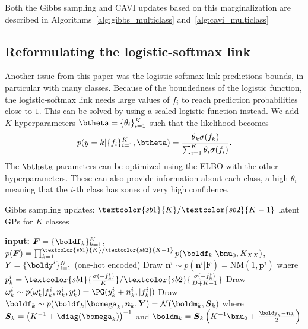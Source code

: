Both the Gibbs sampling and \ac{CAVI} updates based on this marginalization are described in Algorithms~\ref{alg:gibbs_multiclass} and~\ref{alg:cavi_multiclass}

\subsection{Reformulating the logistic-softmax link}
\label{sec:scale_multiclass}
Another issue from this paper was the logistic-softmax link predictions bounds, in particular with many classes.
Because of the boundedness of the logistic function, the logistic-softmax link needs large values of $f_i$ to reach prediction probabilities close to $1$.
This can be solved by using a scaled logistic function instead.
We add $K$ hyperparameters $\btheta=\{\theta_{i}\}_{i=1}^K$ such that the likelihood becomes
\begin{align*}
    p(y=k|\{f_i\}_{i=1}^K,\btheta) = \frac{\theta_k \sigma(f_k)}{\sum_{i=1}^K \theta_i \sigma(f_i)}.
\end{align*}
The $\btheta$ parameters can be optimized using the \ac{ELBO} with the other hyperparameters.
These can also provide information about each class, a high $\theta_i$ meaning that the $i$-th class has zones of very high confidence.

\begin{algorithm}[H]
    \caption{Gibbs sampling updates: $\textcolor{sb1}{K}/\textcolor{sb2}{K - 1}$ latent \ac{GPs} for $K$ classes}
    \begin{algorithmic}
    \State \textbf{input:} $\boldsymbol{F} = \{\boldf_k\}_{k=1}^K$, $p(\boldsymbol{F}) = \prod_{k=1}^{\textcolor{sb1}{K}/\textcolor{sb2}{K - 1}} p(\boldf_k|\bmu_0, K_{XX})$, $Y=\{\boldy^i\}_{i=1}^N$ (one-hot encoded)
        \State Draw $\boldsymbol{n}^i \sim p(\boldsymbol{n}^i|\boldsymbol{F}) = \mathrm{NM}(1, \boldsymbol{p}^i)$ where 
        $p_k^i = \textcolor{sb1}{\frac{\sigma(-f_k^i)}{K}}/\textcolor{sb2}{\frac{\sigma(-f_k^i)}{D + K - 1}}$
        \State Draw $\omega_k^i \sim p(\omega_k^i|f_k^i, n_k^i, y_k^i) = \PG(y_k^i + n^i_k, |f_k^i|)$
        \State Draw $\boldf_k \sim p(\boldf_k|\bomega_k,\boldsymbol{n}_k, \boldsymbol{Y}) = \mathcal{N}(\boldm_k, \boldsymbol{S}_k)$
        \State where $\boldsymbol{S}_k = \left(K^{-1} + \diag(\bomega_k)\right)^{-1}$ and $\boldm_k = \boldsymbol{S}_k\left(K^{-1}\bmu_0 + \frac{\boldy_k - \boldsymbol{n}_k}{2}\right)$
    \EndFor
    \end{algorithmic}
    \label{alg:gibbs_multiclass}
\end{algorithm}

